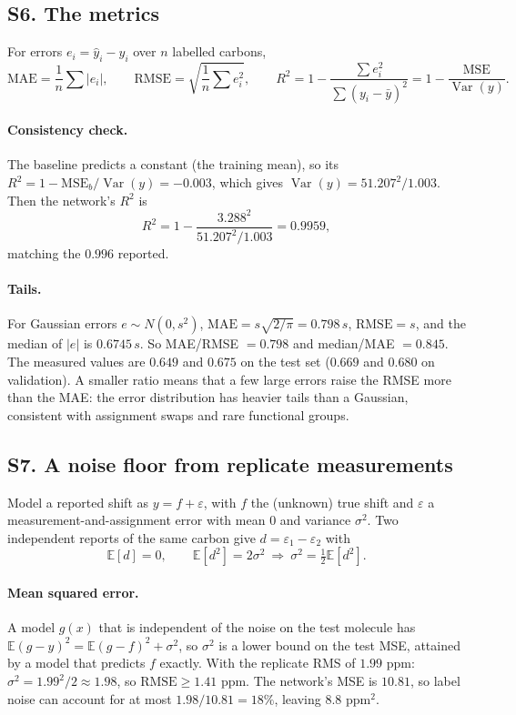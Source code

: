 \documentclass[11pt]{article}
\newcommand{\E}{\mathbb{E}}
\begin{document}
\label{sec:S6}
\subsection*{S6. The metrics}
For errors $e_i=\hat y_i-y_i$ over $n$ labelled carbons,
\[
  \mathrm{MAE}=\frac1n\sum|e_i|,\qquad
  \mathrm{RMSE}=\sqrt{\frac1n\sum e_i^2},\qquad
  R^2=1-\frac{\sum e_i^2}{\sum(y_i-\bar y)^2}=1-\frac{\mathrm{MSE}}{\operatorname{Var}(y)} .
\]
\paragraph{Consistency check.} The baseline predicts a constant (the training mean), so its $R^2=1-\mathrm{MSE}_b/\operatorname{Var}(y)=-0.003$, which gives $\operatorname{Var}(y)=51.207^2/1.003$. Then the network's $R^2$ is
\[
  R^2=1-\frac{3.288^2}{51.207^2/1.003}=0.9959,
\]
matching the $0.996$ reported.

\paragraph{Tails.} For Gaussian errors $e\sim N(0,s^2)$, $\mathrm{MAE}=s\sqrt{2/\pi}=0.798\,s$, $\mathrm{RMSE}=s$, and the median of $|e|$ is $0.6745\,s$. So MAE/RMSE $=0.798$ and median/MAE $=0.845$. The measured values are $0.649$ and $0.675$ on the test set ($0.669$ and $0.680$ on validation). A smaller ratio means that a few large errors raise the RMSE more than the MAE: the error distribution has heavier tails than a Gaussian, consistent with assignment swaps and rare functional groups.

\label{sec:S7}
\subsection*{S7. A noise floor from replicate measurements}
Model a reported shift as $y=f+\varepsilon$, with $f$ the (unknown) true shift and $\varepsilon$ a measurement-and-assignment error with mean $0$ and variance $\sigma^2$. Two independent reports of the same carbon give $d=\varepsilon_1-\varepsilon_2$ with
\[
  \E[d]=0,\qquad \E[d^2]=2\sigma^2\ \Longrightarrow\ \sigma^2=\tfrac12\E[d^2].
\]
\paragraph{Mean squared error.} A model $g(x)$ that is independent of the noise on the test molecule has $\E(g-y)^2=\E(g-f)^2+\sigma^2$, so $\sigma^2$ is a lower bound on the test MSE, attained by a model that predicts $f$ exactly. With the replicate RMS of $1.99$ ppm: $\sigma^2=1.99^2/2\approx1.98$, so $\mathrm{RMSE}\ge1.41$ ppm. The network's MSE is $10.81$, so label noise can account for at most $1.98/10.81=18\%$, leaving $8.8$ ppm$^2$.
\end{document}
